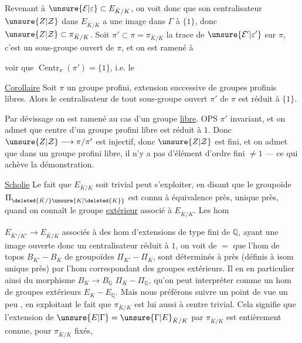 Revenant à $\unsure{\mathcal E|\varepsilon}\subset E_{\bar K/K}$, on voit donc que son centralisateur $\unsure{Z|\mathcal Z}$ dans $E_{\bar K/K}$ a une image dans $\Gamma$  à $\{1\}$, donc $\unsure{Z|\mathcal Z}\subset\pi_{\bar K/K}$. Soit $\pi'\subset\pi=\pi_{\bar K/K}$ la trace de $\unsure{\mathcal E'|\varepsilon'}$ sur $\pi$, c'est un sous-groupe ouvert de $\pi$, et on est ramené à

voir que $\operatorname{Centr}_{\pi}(\pi')=\{1\}$, i.e. le

\uline{Corollaire} Soit $\pi$ un groupe profini, extension successive de groupes profinis libres. Alors le centralisateur  de tout sous-groupe ouvert $\pi'$ de $\pi$ est réduit à $\{1\}$.

Par dévissage on est ramené au cas d'un groupe  \uline{libre}.  OPS $\pi'$ invariant, et on admet que  centre d'un groupe profini libre est réduit à $1$.
Donc $\unsure{Z|\mathcal Z}\longrightarrow\pi/\pi'$ est injectif, donc $\unsure{Z|\mathcal Z}$ est fini, et on admet que dans un groupe profini libre, il n'y a pas d'élément d'ordre fini $\neq1$  --- ce qui achève la démonstration.

\uline{Scholie} Le fait que $E_{\bar K/K}$ soit   trivial peut s'exploiter, en disant que le groupoïde $\Pi_{\deleted{\bar K/}\unsure{K|\deleted{K}}}$  est connu à équivalence près,  unique près, quand on connaît le groupe \uline{extérieur} associé à $E_{\bar K/K}$. Les hom

$E_{\bar K'/K'}\longrightarrow E_{\bar K/K}$ associés à des hom  d'extensions de type fini de $\mathbb Q$, ayant une image ouverte donc un centralisateur réduit à $1$, on voit de $=$ que l'hom de topos $B_{K'}-B_K$  de groupoïdes $\Pi_{K'}-\Pi_K$, sont déterminés à  près (définis à isom unique près) par l'hom correspondant des groupes extérieurs. Il en  en particulier ainsi du morphisme  $B_K\longrightarrow B_{\mathbb Q}$  $\Pi_K-\Pi_{\mathbb Q}$, qu'on peut interpréter  comme un hom de groupes  extérieurs $E_K-E_{\mathbb Q}$. Mais nous préférons suivre un point de vue un peu , en exploitant le fait que $\pi_{\bar K/K}$ est lui aussi à centre trivial. Cela signifie que l'extension de $\unsure{E|\Gamma}=\unsure{\Gamma|E}_{\bar K/K}$ par $\pi_{\bar K/K}$ est entièrement connue,  pour $\pi_{\bar K/K}$  fixés,


